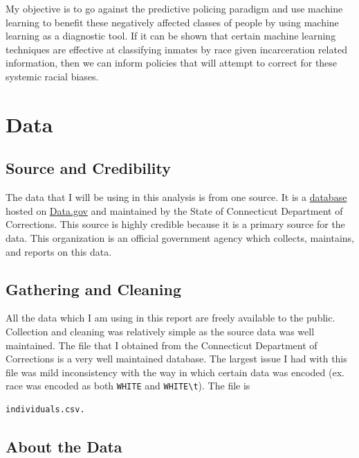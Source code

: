 \documentclass[11pt]{article}
\begin{document}
My objective is to go against the predictive policing paradigm and use
machine learning to benefit these negatively affected classes of people
by using machine learning as a diagnostic tool. If it can be shown that
certain machine learning techniques are effective at classifying inmates
by race given incarceration related information, then we can inform
policies that will attempt to correct for these systemic racial biases.

    \hypertarget{data}{%
\section{Data}\label{data}}

\hypertarget{source-and-credibility}{%
\subsection{Source and Credibility}\label{source-and-credibility}}

The data that I will be using in this analysis is from one source. It is
a
\href{https://catalog.data.gov/dataset/sentenced-inmates-in-correctional-facilities}{database}
hosted on \href{https://www.data.gov}{Data.gov} and maintained by the
State of Connecticut Department of Corrections. This source is highly
credible because it is a primary source for the data. This organization
is an official government agency which collects, maintains, and reports
on this data.

\hypertarget{gathering-and-cleaning}{%
\subsection{Gathering and Cleaning}\label{gathering-and-cleaning}}

All the data which I am using in this report are freely available to the
public. Collection and cleaning was relatively simple as the source data
was well maintained. The file that I obtained from the Connecticut
Department of Corrections is a very well maintained database. The
largest issue I had with this file was mild inconsistency with the way
in which certain data was encoded (ex. race was encoded as both
\texttt{WHITE} and \texttt{WHITE\textbackslash{}t}). The file is

\begin{verbatim}
individuals.csv.
\end{verbatim}

\hypertarget{about-the-data}{%
\subsection{About the Data}\label{about-the-data}}
\end{document}

